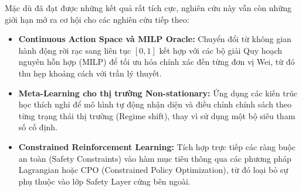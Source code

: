 Mặc dù đã đạt được những kết quả rất tích cực, nghiên cứu này vẫn còn những giới hạn mở ra cơ hội cho các nghiên cứu tiếp theo:

\begin{itemize}
    \item \textbf{Continuous Action Space và MILP Oracle:} Chuyển đổi từ không gian hành động rời rạc sang liên tục $[0, 1]$ kết hợp với các bộ giải Quy hoạch nguyên hỗn hợp (MILP) để tối ưu hóa chính xác đến từng đơn vị Wei, từ đó thu hẹp khoảng cách với trần lý thuyết.
    \item \textbf{Meta-Learning cho thị trường Non-stationary:} Ứng dụng các kiến trúc học thích nghi để mô hình tự động nhận diện và điều chỉnh chính sách theo từng trạng thái thị trường (Regime shift), thay vì sử dụng một bộ siêu tham số cố định.
    \item \textbf{Constrained Reinforcement Learning:} Tích hợp trực tiếp các ràng buộc an toàn (Safety Constraints) vào hàm mục tiêu thông qua các phương pháp Lagrangian hoặc CPO (Constrained Policy Optimization), từ đó loại bỏ sự phụ thuộc vào lớp Safety Layer cứng bên ngoài.
\end{itemize}
